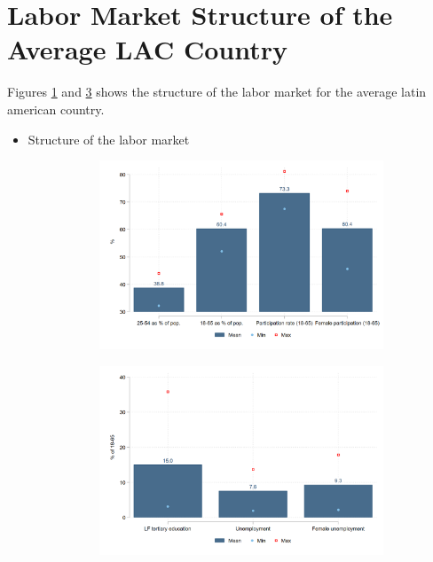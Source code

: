 \documentclass[english]{article}
\begin{document}
\section{Labor Market Structure of the Average LAC Country}
Figures \ref{fig:labmarket1} and \ref{fig:labmarket2} shows the structure of the labor market for the average latin american country. 
\begin{itemize}
    \item Structure of the labor market 
\begin{figure}[!htb]
\justifying
  \caption{Demographic profile and structure of labor market}
\begin{subfigure}{.9\textwidth}
  \centering
  \includegraphics[width=1\linewidth]{latex/figures/Snapshot/Structure of labor market_a.png}
  \label{fig:labmarket1}
\end{subfigure}

\begin{subfigure}{.9\textwidth}
  \centering
  \includegraphics[width=1\linewidth]{latex/figures/Snapshot/Structure of labor market_b.png}
  \label{fig:labmarket2}
\end{subfigure}


\end{figure}
\end{itemize}
\end{document}
